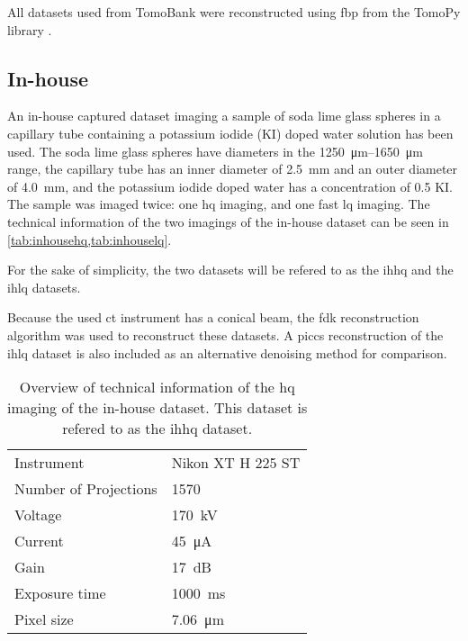 All datasets used from TomoBank were reconstructed using \acrshort{fbp} from the TomoPy library \cite{tomopy}. 


\subsection{In-house}
An in-house captured dataset imaging a sample of soda lime glass spheres in a capillary tube containing a potassium iodide (KI) doped water solution has been used. The soda lime glass spheres have diameters in the \SIrange{1250}{1650}{\micro \meter} range, the capillary tube has an inner diameter of \SI{2.5}{\milli \meter} and an outer diameter of \SI{4.0}{\milli \meter}, and the potassium iodide doped water has a concentration of \SI{0.5}{\molar} KI. The sample was imaged twice: one \acrlong{hq} imaging, and one fast \acrlong{lq} imaging. The technical information of the two imagings of the in-house dataset can be seen in \cref{tab:inhousehq,tab:inhouselq}.

For the sake of simplicity, the two datasets will be refered to as the \acrfull{ihhq} and the \acrfull{ihlq} datasets. 

Because the used \acrshort{ct} instrument has a conical beam, the \acrshort{fdk} reconstruction algorithm was used to reconstruct these datasets. A \acrshort{piccs} reconstruction of the \acrshort{ihlq} dataset is also included as an alternative denoising method for comparison. 

\begin{table}[htbp]
    \centering
    \caption[Technical information of the IHHQ dataset]{Overview of technical information of the \acrlong{hq} imaging of the in-house dataset. This dataset is refered to as the \acrshort{ihhq} dataset. }
    \label{tab:inhousehq}
    \begin{tabular}{ll}
    \hline
    Instrument & Nikon XT H 225 ST \\
    Number of Projections & 1570 \\
    Voltage & \SI{170}{\kilo \volt}\\
    Current & \SI{45}{\micro \ampere}\\
    Gain & \SI{17}{\deci \bel}\\
    Exposure time & \SI{1000}{\milli \second}\\
    Pixel size & \SI{7.06}{\micro \meter} \\
    \hline
    \end{tabular}
\end{table}

